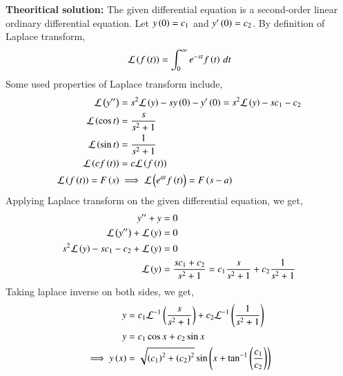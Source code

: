 \documentclass[journal]{IEEEtran}
\begin{document}
\textbf{Theoritical solution:} \newline
The given differential equation is a second-order linear ordinary differential equation. \newline
Let $y\left(0\right) = c_1$ and $y^{\prime}\left(0\right) = c_2$.
By definition of Laplace transform,
\begin{align}
    \mathcal{L}\left(f\left(t\right)\right) = \int_0^{\infty} e^{-st} f\left(t\right) \, dt
\end{align}
Some used properties of Laplace transform include,
\begin{align}
    \mathcal{L}\left(y^{\prime\prime}\right) &= s^2\mathcal{L}\left(y\right) -sy\left(0\right)-y^\prime\left(0\right) = s^2\mathcal{L}\left(y\right) -sc_1 - c_2\\
    \mathcal{L}\left(\cos{t}\right) &= \frac{s}{s^2 + 1}\\
    \mathcal{L}\left(\sin{t}\right) &= \frac{1}{s^2 + 1}\\
    \mathcal{L}\left(cf\left(t\right)\right) &= c\mathcal{L}\left(f\left(t\right)\right)\\
    \mathcal{L}\left(f\left(t\right)\right) = F\left(s\right) &\implies \mathcal{L}\left(e^{at}f\left(t\right)\right) = F\left(s-a\right)
\end{align}
Applying Laplace transform on the given differential equation, we get,
\begin{align}
    y^{\prime\prime} + y &= 0\\
    \mathcal{L}\left(y^{\prime\prime}\right) + \mathcal{L}\left(y\right) &= 0\\
    s^2\mathcal{L}\left(y\right) - sc_1 - c_2 + \mathcal{L}\left(y\right) &= 0\\
    \mathcal{L}\left(y\right) &= \frac{sc_1 + c_2}{s^2 + 1} = c_1\frac{s}{s^2 + 1} + c_2\frac{1}{s^2 + 1} \label{laplace_eq}\\
\end{align}
Taking laplace inverse on both sides, we get,
\begin{align}
    y &= c_1\mathcal{L}^{-1}\left(\frac{s}{s^2 + 1}\right) + c_2\mathcal{L}^{-1}\left(\frac{1}{s^2 + 1}\right)\\
    y &= c_1\cos{x} + c_2\sin{x}\\
    \implies y\left(x\right) &= \sqrt{\left(c_1\right)^2 + \left(c_2\right)^2} \sin{\ensuremath{\left(x + \tan^{-1}{\left(\frac{c_1}{c_2}\right)}\right)}}
\end{align}
\end{document}
